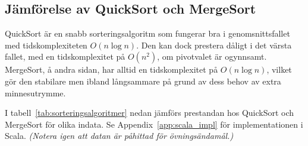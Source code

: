 \documentclass[a4paper,12pt]{article}   %
\begin{document}
\subsection{Jämförelse av QuickSort och MergeSort}

QuickSort är en snabb sorteringsalgoritm som fungerar bra i genomsnittsfallet med tidskomplexiteten $O(n \log n)$. Den kan dock prestera dåligt i det värsta fallet, med en tidskomplexitet på $O(n^2)$, om pivotvalet är ogynnsamt. MergeSort, å andra sidan, har alltid en tidskomplexitet på $O(n \log n)$, vilket gör den stabilare men ibland långsammare på grund av dess behov av extra minnesutrymme.

I tabell~\ref{tab:sorteringsalgoritmer} nedan jämförs prestandan hos QuickSort och MergeSort för olika indata. Se Appendix~\ref{app:scala_impl} för implementationen i Scala. \emph{(Notera igen att datan är påhittad för övningsändamål.)}
\end{document}
